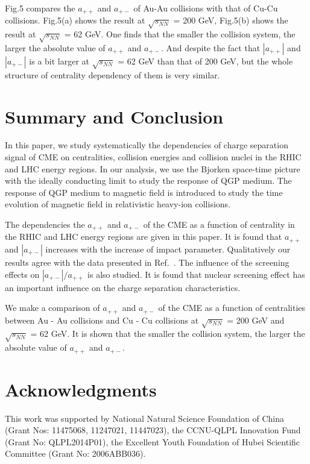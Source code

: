 \documentclass[twocolumn,showpacs,preprintnumbers,amsmath,amssymb]{revtex4}
\begin{document}
Fig.5 compares the $a_{++}$ and $a_{+-}$ of Au-Au collisions with that of Cu-Cu collisions. Fig.5(a) shows the result at $\sqrt{s_{NN}}$ = 200 GeV, Fig.5(b) shows the result at $\sqrt{s_{NN}}$ = 62 GeV. One finds that the smaller the collision system, the larger the absolute value of $a_{++}$ and $a_{+-}$. And despite the fact that $|a_{++}|$ and $|a_{+-}|$ is a bit larger at $\sqrt{s_{NN}}$ = 62 GeV than that of 200 GeV, but the whole structure of centrality dependency of them is very similar.



\section{Summary and Conclusion}
In this paper, we study systematically the dependencies of charge separation signal of CME on centralities, collision energies and collision nuclei in the RHIC and LHC energy regions. In our analysis, we use the Bjorken space-time picture with the ideally conducting limit to study the response of QGP medium. The response of QGP medium to magnetic field is introduced to study the time evolution of magnetic field in relativistic heavy-ion collisions. 

The dependencies the $a_{++}$ and $a_{+-}$ of the CME as a function of centrality in the RHIC and LHC energy regions are given in this paper. It is found that $a_{++}$ and $|a_{+-}|$ increases with the increase of impact parameter.  Qualitatively our results agree with the data presented in Ref.~\cite{lab8,lab9,lab10,lab11}. The influence of the screening effects on $|a_{+-}|/a_{++}$ is also studied. It is found that nuclear screening effect has an important influence on the charge separation characteristics.

We make a comparison of $a_{++}$ and $a_{+-}$ of the CME as a function of centralities between Au - Au collisions and Cu - Cu collisions at $\sqrt{s_{NN}}$ = 200 GeV and $\sqrt{s_{NN}}$ = 62 GeV. It is shown that the smaller the collision system, the larger the absolute value of $a_{++}$ and $a_{+-}$.



\section{Acknowledgments}
This work was supported by National Natural Science Foundation of China (Grant Nos: 11475068, 11247021, 11447023), the CCNU-QLPL Innovation Fund (Grant No: QLPL2014P01),
the Excellent Youth Foundation of Hubei Scientific Committee (Grant No: 2006ABB036).
\end{document}
